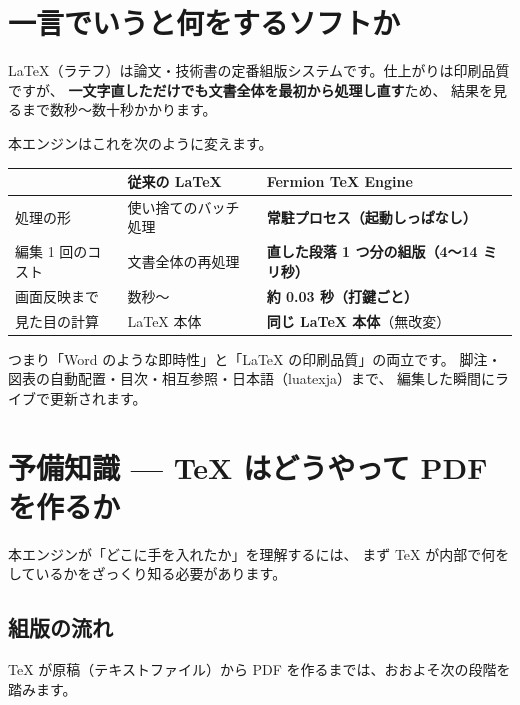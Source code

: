 \documentclass[11pt,a4paper]{ltjsarticle}
\begin{document}
\section{一言でいうと何をするソフトか}

LaTeX（ラテフ）は論文・技術書の定番組版システムです。仕上がりは印刷品質ですが、
\textbf{一文字直しただけでも文書全体を最初から処理し直す}ため、
結果を見るまで数秒〜数十秒かかります。

本エンジンはこれを次のように変えます。

\begin{center}
\begin{tabular}{p{}p{}p{}}
\toprule
& 従来の LaTeX & Fermion TeX Engine \\
\midrule
処理の形 & 使い捨てのバッチ処理 & \textbf{常駐プロセス（起動しっぱなし）} \\
編集 1 回のコスト & 文書全体の再処理 & \textbf{直した段落 1 つ分の組版（4〜14 ミリ秒）} \\
画面反映まで & 数秒〜 & \textbf{約 0.03 秒（打鍵ごと）} \\
見た目の計算 & LaTeX 本体 & \textbf{同じ LaTeX 本体}（無改変） \\
\bottomrule
\end{tabular}
\end{center}

つまり「Word のような即時性」と「LaTeX の印刷品質」の両立です。
脚注・図表の自動配置・目次・相互参照・日本語（luatexja）まで、
編集した瞬間にライブで更新されます。

\section{予備知識 --- TeX はどうやって PDF を作るか}
\label{sec:tex-basics}

本エンジンが「どこに手を入れたか」を理解するには、
まず TeX が内部で何をしているかをざっくり知る必要があります。

\subsection{組版の流れ}

TeX が原稿（テキストファイル）から PDF を作るまでは、おおよそ次の段階を踏みます。
\end{document}
